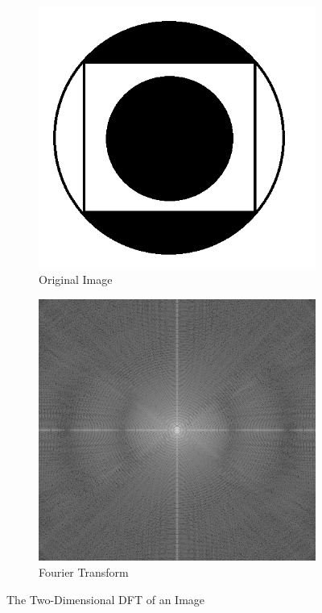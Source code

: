 \documentclass{amsproc}
\begin{document}
\begin{figure}[h]
\centering
\begin{subfigure}{.4\textwidth}
	\centering
	\includegraphics[scale=.3]{images/dftraw1.png}
	\caption{Original Image}
	\label{fig:sub11}
\end{subfigure} \hspace{15mm}
\begin{subfigure}{.4\textwidth}
	\centering
	\includegraphics[scale=.3]{images/2ddft1.png}
	\caption{Fourier Transform}
	\label{fig:sub12}
\end{subfigure}
\caption{The Two-Dimensional DFT of an Image}
\label{fig:im3}
\end{figure}
\end{document}
